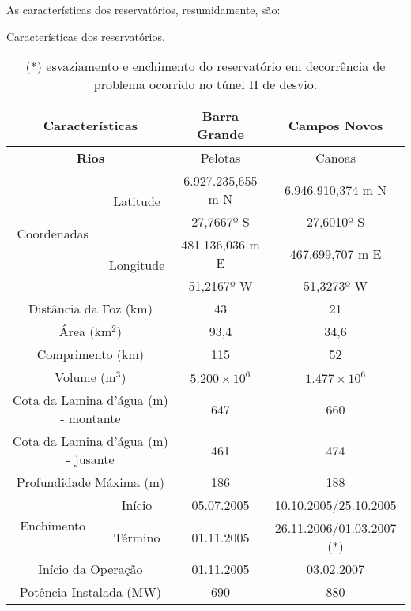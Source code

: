 \newpage
\par{As características dos reservatórios, resumidamente, são:}
\begin{table}[h!]
\begin{small}
\centering
\captionsetup{justification=justified,singlelinecheck=false}
\caption{Características dos reservatórios.}
\begin{tabular}{|c|c|c|c|}
\hline
\multicolumn{2}{|c|}{\textbf{Características}} & \textbf{Barra Grande} & \textbf{Campos Novos} \\
\hline
\multicolumn{2}{|c|}{\textbf{Rios}} & Pelotas & Canoas \\
\hline
    \multirow{4}{*}{Coordenadas}
        & \multirow{2}{*}{Latitude}
            & 6.927.235,655 m N & 6.946.910,374 m N \\
            \cline{3-4}
            && 27,7667º S & 27,6010º S\\
            \cline{2-4}
        & \multirow{2}{*}{Longitude}
            & 481.136,036 m E & 467.699,707 m E \\
            \cline{3-4}
            && 51,2167º W & 51,3273º W \\
\hline
\multicolumn{2}{|c|}{Distância da Foz (km)} & 43 &  21 \\ \hline
\multicolumn{2}{|c|}{Área (km$^2$)} & 93,4 &  34,6 \\ \hline
\multicolumn{2}{|c|}{Comprimento (km)} & 115 &  52 \\ \hline
\multicolumn{2}{|c|}{Volume (m$^3$)} & $5.200 \times 10^6$ &  $1.477 \times 10^6$ \\ \hline
\multicolumn{2}{|c|}{Cota da Lamina d'água (m) - montante} & 647 &  660 \\ \hline
\multicolumn{2}{|c|}{Cota da Lamina d'água (m) - jusante} & 461 &  474 \\ \hline
\multicolumn{2}{|c|}{Profundidade Máxima (m)} & 186 &  188 \\ \hline
    \multirow{2}{*}{Enchimento}
        & Início & 05.07.2005 & 10.10.2005/25.10.2005 \\
        \cline{2-4}
        & Término & 01.11.2005 & 26.11.2006/01.03.2007 (*) \\
        \hline
\multicolumn{2}{|c|}{Início da Operação} & 01.11.2005 & 03.02.2007 \\ \hline
\multicolumn{2}{|c|}{Potência Instalada (MW)} &  690 & 880 \\ \hline
\end{tabular}
\caption*{(*) esvaziamento e enchimento do reservatório em decorrência de problema ocorrido no túnel II de desvio.}
\end{small}
\end{table}

